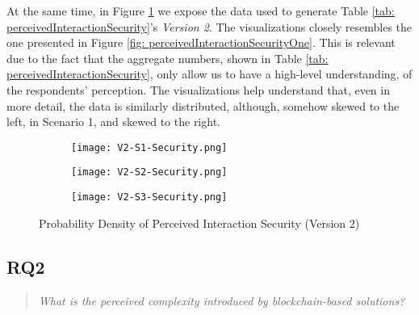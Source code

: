 At the same time, in Figure \ref{fig: perceivedInteractionSecurityTwo} we expose the data used to generate Table \ref{tab: perceivedInteractionSecurity}'s \textit{Version 2}. The visualizations closely resembles the one presented in Figure \ref{fig: perceivedInteractionSecurityOne}. This is relevant due to the fact that the aggregate numbers, shown in Table \ref{tab: perceivedInteractionSecurity}, only allow us to have a high-level understanding, of the respondents' perception. The visualizations help understand that, even in more detail, the data is similarly distributed, although, somehow skewed to the left, in Scenario 1, and skewed to the right.

\begin{figure}[htb]
	\centering
	\begin{subfigure}[b]{0.49\textwidth}
		\centering
		\texttt{[image: V2-S1-Security.png]}
	\end{subfigure}
	\begin{subfigure}[b]{0.49\textwidth}
		\centering
		\texttt{[image: V2-S2-Security.png]}
	\end{subfigure}
	\hfill
	\begin{subfigure}[b]{0.49\textwidth}
		\centering
		\texttt{[image: V2-S3-Security.png]}
	\end{subfigure}

	\caption{Probability Density of Perceived Interaction Security (Version 2)}
	\label{fig: perceivedInteractionSecurityTwo}
\end{figure}

\subsection{RQ2}

\begin{quote}
	\textit{What is the perceived complexity introduced by blockchain-based solutions?}
\end{quote}


